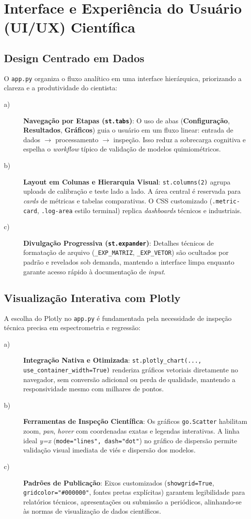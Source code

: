 \chapter{Interface e Experiência do Usuário (UI/UX) Científica}
\section{Design Centrado em Dados}
O \verb|app.py| organiza o fluxo analítico em uma interface hierárquica, priorizando a clareza e a produtividade do cientista:
\begin{description}
\item[a)] \textbf{Navegação por Etapas (\texttt{st.tabs})}: O uso de abas (\textbf{Configuração}, \textbf{Resultados}, \textbf{Gráficos}) guia o usuário em um fluxo linear: entrada de dados $\rightarrow$ processamento $\rightarrow$ inspeção. Isso reduz a sobrecarga cognitiva e espelha o \textit{workflow} típico de validação de modelos quimiométricos.
\item[b)] \textbf{Layout em Colunas e Hierarquia Visual}: \verb|st.columns(2)| agrupa uploads de calibração e teste lado a lado. A área central é reservada para \textit{cards} de métricas e tabelas comparativas. O CSS customizado (\verb|.metric-card|, \verb|.log-area| estilo terminal) replica \textit{dashboards} técnicos e industriais.
\item[c)] \textbf{Divulgação Progressiva (\texttt{st.expander})}: Detalhes técnicos de formatação de arquivo (\verb|_EXP_MATRIZ|, \verb|_EXP_VETOR|) são ocultados por padrão e revelados sob demanda, mantendo a interface limpa enquanto garante acesso rápido à documentação de \textit{input}.
\end{description}

\section{Visualização Interativa com Plotly}
A escolha do Plotly no \verb|app.py| é fundamentada pela necessidade de inspeção técnica precisa em espectrometria e regressão:
\begin{description}
\item[a)] \textbf{Integração Nativa e Otimizada}: \texttt{st.plotly\_chart(..., use\_container\_width=True)}
 renderiza gráficos vetoriais diretamente no navegador, sem conversão adicional ou perda de qualidade, mantendo a responsividade mesmo com milhares de pontos.
\item[b)] \textbf{Ferramentas de Inspeção Científica}: Os gráficos \verb|go.Scatter| habilitam zoom, \textit{pan}, \textit{hover} com coordenadas exatas e legendas interativas. A linha ideal \textit{y=x} (\texttt{mode="lines", dash="dot"}) no gráfico de dispersão permite validação visual imediata de viés e dispersão dos modelos.
\item[c)] \textbf{Padrões de Publicação}: Eixos customizados (\verb|showgrid=True|, \verb|gridcolor="#000000"|, fontes pretas explícitas) garantem legibilidade para relatórios técnicos, apresentações ou submissão a periódicos, alinhando-se às normas de visualização de dados científicos.
\end{description}

